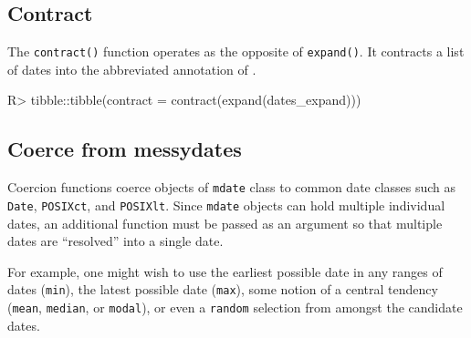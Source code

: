 \documentclass[
]{jss}
\begin{document}
\hypertarget{contract}{%
\subsection{Contract}\label{contract}}

The \texttt{contract()} function operates as the opposite of
\texttt{expand()}. It contracts a list of dates into the abbreviated
annotation of .

\begin{CodeChunk}
\begin{CodeInput}
R> tibble::tibble(contract = contract(expand(dates_expand)))
\end{CodeInput}
\begin{CodeOutput}
# A tibble: 7 x 1
  contract                                                                      
  <mdate>                                                                       
1 2001-01-01                                                                   ~
2 2001-01                                                                      ~
3 2001                                                                         ~
4 2001-01-01..2001-02-02                                                       ~
5 {2001-01-01,2001-02-02}                                                      ~
6 {2001-01-31,2001-02-28,2001-03-31,2001-04-30,2001-05-31,2001-06-30,2001-07-31~
7 -0021                                                                        ~
\end{CodeOutput}
\end{CodeChunk}

\hypertarget{coerce-from-messydates}{%
\subsection{Coerce from messydates}\label{coerce-from-messydates}}

Coercion functions coerce objects of \texttt{mdate} class to common date
classes such as \texttt{Date}, \texttt{POSIXct}, and \texttt{POSIXlt}.
Since \texttt{mdate} objects can hold multiple individual dates, an
additional function must be passed as an argument so that multiple dates
are ``resolved'' into a single date.

For example, one might wish to use the earliest possible date in any
ranges of dates (\texttt{min}), the latest possible date (\texttt{max}),
some notion of a central tendency (\texttt{mean}, \texttt{median}, or
\texttt{modal}), or even a \texttt{random} selection from amongst the
candidate dates.
\end{document}

